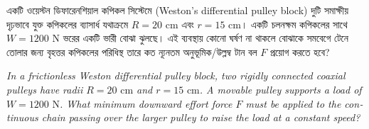 \documentclass[12pt, a4paper]{article}
\begin{document}
\newpage

\begin{tcolorbox}[questionbox={প্রশ্ন (Question) 11}]
    \noindent
    একটি ওয়েস্টন ডিফারেনশিয়াল কপিকল সিস্টেমে (Weston's differential pulley block) দুটি সমাক্ষীয় দৃঢ়ভাবে যুক্ত কপিকলের ব্যাসার্ধ যথাক্রমে $R = 20\text{ cm}$ এবং $r = 15\text{ cm}$। একটি চলনক্ষম কপিকলের সাথে $W = 1200\text{ N}$ ভরের একটি ভারী বোঝা ঝুলছে। এই ব্যবস্থায় কোনো ঘর্ষণ না থাকলে বোঝাকে সমবেগে টেনে তোলার জন্য বৃহত্তর কপিকলের পরিধিস্থ তারে কত ন্যূনতম অনুভূমিক/উল্লম্ব টান বল $F$ প্রয়োগ করতে হবে?
    
    \vspace{0.8em}
    \begin{english}
    \noindent\textit{\color{darkgray}
    In a frictionless Weston differential pulley block, two rigidly connected coaxial pulleys have radii $R = 20\text{ cm}$ and $r = 15\text{ cm}$. A movable pulley supports a load of $W = 1200\text{ N}$. What minimum downward effort force $F$ must be applied to the continuous chain passing over the larger pulley to raise the load at a constant speed?
    }
    \end{english}
\end{tcolorbox}
\end{document}

